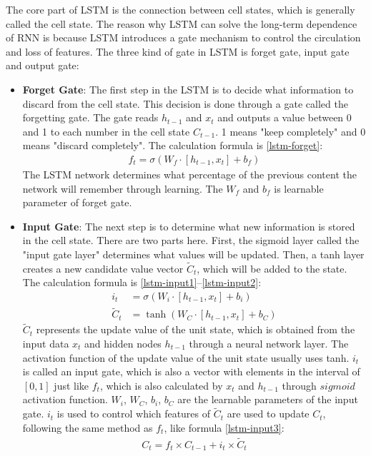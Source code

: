 The core part of LSTM is the connection between cell states, which is generally called the cell state. The reason why LSTM can solve the long-term dependence of RNN is because LSTM introduces a gate mechanism to control the circulation and loss of features. The three kind of gate in LSTM is forget gate, input gate and output gate: 
\begin{itemize}
	\item \textbf{Forget Gate}: The first step in the LSTM is to decide what information to discard from the cell state. This decision is done through a gate called the forgetting gate. The gate reads $h_{t-1}$ and $x_t$ and outputs a value between 0 and 1 to each number in the cell state $C_{t-1}$. 1 means "keep completely" and 0 means "discard completely". The calculation formula is \ref{lstm-forget}:
	\begin{align}
		f_{t}=\sigma\left(W_{f} \cdot\left[h_{t-1}, x_{t}\right]+b_{f}\right) \label{lstm-forget}
	\end{align}
	The LSTM network determines what percentage of the previous content the network will remember through learning. The $W_f$ and $b_f$ is learnable parameter of forget gate.
	\item \textbf{Input Gate}: The next step is to determine what new information is stored in the cell state. There are two parts here. First, the sigmoid layer called the "input gate layer" determines what values will be updated. Then, a tanh layer creates a new candidate value vector $\widetilde{C}_t$, which will be added to the state. The calculation formula is \ref{lstm-input1}--\ref{lstm-input2}: 
	\begin{align}
		i_{t} &=\sigma\left(W_{i} \cdot\left[h_{t-1}, x_{t}\right]+b_{i}\right) \label{lstm-input1}\\
		\tilde{C}_{t} &=\tanh \left(W_{C} \cdot\left[h_{t-1}, x_{t}\right]+b_{C}\right) \label{lstm-input2}
	\end{align}
	$\tilde{C}_{t}$ represents the update value of the unit state, which is obtained from the input data $x_t$ and hidden nodes $h_{t-1}$ through a neural network layer. The activation function of the update value of the unit state usually uses tanh. $i_t$ is called an input gate, which is also a vector with elements in the interval of $[0,1]$ just like $f_t$, which is also calculated by $x_t$ and $h_{t-1}$ through $sigmoid$ activation function. $W_i$, $W_C$, $b_i$, $b_C$ are the learnable parameters of the input gate. $i_t$ is used to control which features of $\tilde{C}_{t}$ are used to update $C_t$, following the same method as $f_t$, like formula \ref{lstm-input3}: 
	\begin{align}
		C_{t}=f_{t} \times C_{t-1}+i_{t} \times \tilde{C}_{t} \label{lstm-input3}
	\end{align}	


\end{itemize}
